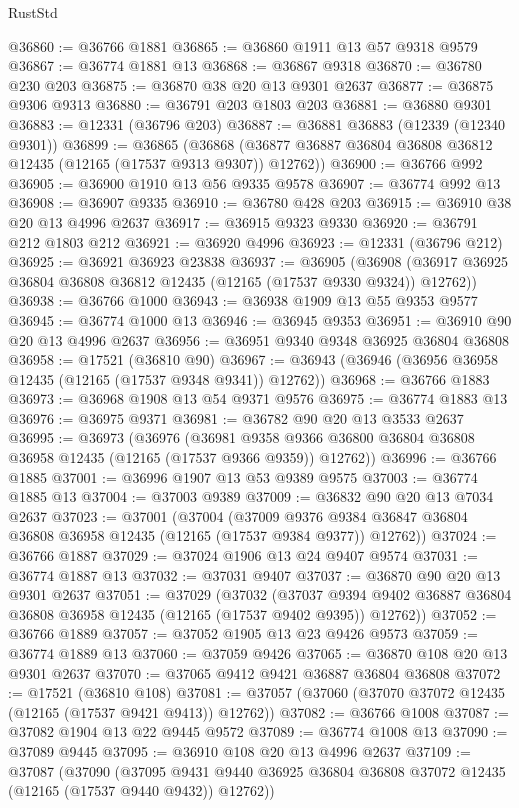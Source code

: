 \begin{lexlean}{RustStd}
\begin{coremodule}
@36860 := @36766 @1881
@36865 := @36860 @1911 @13 @57 @9318 @9579
@36867 := @36774 @1881 @13
@36868 := @36867 @9318
@36870 := @36780 @230 @203
@36875 := @36870 @38 @20 @13 @9301 @2637
@36877 := @36875 @9306 @9313
@36880 := @36791 @203 @1803 @203
@36881 := @36880 @9301
@36883 := @12331 (@36796 @203)
@36887 := @36881 @36883 (@12339 (@12340 @9301))
@36899 := @36865
    (@36868 (@36877 @36887 @36804 @36808 @36812 @12435 (@12165 (@17537 @9313 @9307)) @12762))
@36900 := @36766 @992
@36905 := @36900 @1910 @13 @56 @9335 @9578
@36907 := @36774 @992 @13
@36908 := @36907 @9335
@36910 := @36780 @428 @203
@36915 := @36910 @38 @20 @13 @4996 @2637
@36917 := @36915 @9323 @9330
@36920 := @36791 @212 @1803 @212
@36921 := @36920 @4996
@36923 := @12331 (@36796 @212)
@36925 := @36921 @36923 @23838
@36937 := @36905
    (@36908 (@36917 @36925 @36804 @36808 @36812 @12435 (@12165 (@17537 @9330 @9324)) @12762))
@36938 := @36766 @1000
@36943 := @36938 @1909 @13 @55 @9353 @9577
@36945 := @36774 @1000 @13
@36946 := @36945 @9353
@36951 := @36910 @90 @20 @13 @4996 @2637
@36956 := @36951 @9340 @9348 @36925 @36804 @36808
@36958 := @17521 (@36810 @90)
@36967 := @36943 (@36946 (@36956 @36958 @12435 (@12165 (@17537 @9348 @9341)) @12762))
@36968 := @36766 @1883
@36973 := @36968 @1908 @13 @54 @9371 @9576
@36975 := @36774 @1883 @13
@36976 := @36975 @9371
@36981 := @36782 @90 @20 @13 @3533 @2637
@36995 := @36973
    (@36976
      (@36981 @9358 @9366 @36800 @36804 @36808 @36958 @12435 (@12165 (@17537 @9366 @9359)) @12762))
@36996 := @36766 @1885
@37001 := @36996 @1907 @13 @53 @9389 @9575
@37003 := @36774 @1885 @13
@37004 := @37003 @9389
@37009 := @36832 @90 @20 @13 @7034 @2637
@37023 := @37001
    (@37004
      (@37009 @9376 @9384 @36847 @36804 @36808 @36958 @12435 (@12165 (@17537 @9384 @9377)) @12762))
@37024 := @36766 @1887
@37029 := @37024 @1906 @13 @24 @9407 @9574
@37031 := @36774 @1887 @13
@37032 := @37031 @9407
@37037 := @36870 @90 @20 @13 @9301 @2637
@37051 := @37029
    (@37032
      (@37037 @9394 @9402 @36887 @36804 @36808 @36958 @12435 (@12165 (@17537 @9402 @9395)) @12762))
@37052 := @36766 @1889
@37057 := @37052 @1905 @13 @23 @9426 @9573
@37059 := @36774 @1889 @13
@37060 := @37059 @9426
@37065 := @36870 @108 @20 @13 @9301 @2637
@37070 := @37065 @9412 @9421 @36887 @36804 @36808
@37072 := @17521 (@36810 @108)
@37081 := @37057 (@37060 (@37070 @37072 @12435 (@12165 (@17537 @9421 @9413)) @12762))
@37082 := @36766 @1008
@37087 := @37082 @1904 @13 @22 @9445 @9572
@37089 := @36774 @1008 @13
@37090 := @37089 @9445
@37095 := @36910 @108 @20 @13 @4996 @2637
@37109 := @37087
    (@37090
      (@37095 @9431 @9440 @36925 @36804 @36808 @37072 @12435 (@12165 (@17537 @9440 @9432)) @12762))

\end{coremodule}
\end{lexlean}
